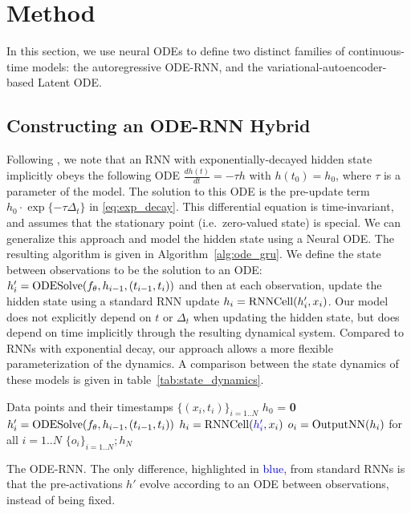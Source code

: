 \documentclass{article}
\begin{document}
\section{Method}

In this section, we use neural ODEs to define two distinct families of continuous-time models: the autoregressive ODE-RNN, and the variational-autoencoder-based Latent ODE.

\subsection{Constructing an ODE-RNN Hybrid}

Following \citet{mozer_2017}, we note that an RNN with exponentially-decayed hidden state implicitly obeys the following ODE $\frac{dh(t)}{dt} = -\tau h$ with $h(t_0) = h_0$,
where $\tau$ is a parameter of the model.
The solution to this ODE is the pre-update term $h_0 \cdot \exp\{-\tau \Delta_t\}$ in \eqref{eq:exp_decay}.
This differential equation is time-invariant, and assumes that the stationary point (i.e.\ zero-valued state) is special.
We can generalize this approach and model the hidden state using a Neural ODE.
The resulting algorithm is given in Algorithm~\ref{alg:ode_gru}.
We define the state between observations to be the solution to an ODE: $h_{i}' = \textnormal{ODESolve}(f_\theta, h_{i-1}, (t_{i-1}, t_i))$ and then at each observation, update the hidden state using a standard RNN update $h_{i} = \textnormal{RNNCell}(h_{i}', x_{i})$.
Our model does not explicitly depend on $t$ or $\Delta_t$ when updating the hidden state, but does depend on time implicitly through the resulting dynamical system.
Compared to RNNs with exponential decay, our approach allows a more flexible parameterization of the dynamics.
A comparison between the state dynamics of these models is given in table~\ref{tab:state_dynamics}.






\begin{algorithm}
\begin{algorithmic}
	 Data points and their timestamps $\{(x_i, t_{i})\}_{i=1..N}$
	\State $h_0$ = \textbf{0}
    \State \textcolor{blue}{$h_{i}' = \textnormal{ODESolve}(f_\theta, h_{i-1}, (t_{i-1}, t_i))$} 
	\State $h_{i} = \textnormal{RNNCell}(\textcolor{blue}{h_{i}'}, x_{i})$ 
	\EndFor
	\State $o_{i} = \textnormal{OutputNN}(h_{i})$ for all $i=1..N$
	 $\{o_i\}_{i=1..N}; h_{N}$
	\end{algorithmic}
	\caption{The ODE-RNN.  The only difference, highlighted in \textcolor{blue}{blue}, from standard RNNs is that the pre-activations $h'$ evolve according to an ODE between observations, instead of being fixed.}
	\label{alg:ode_gru}
\end{algorithm}
\end{document}
